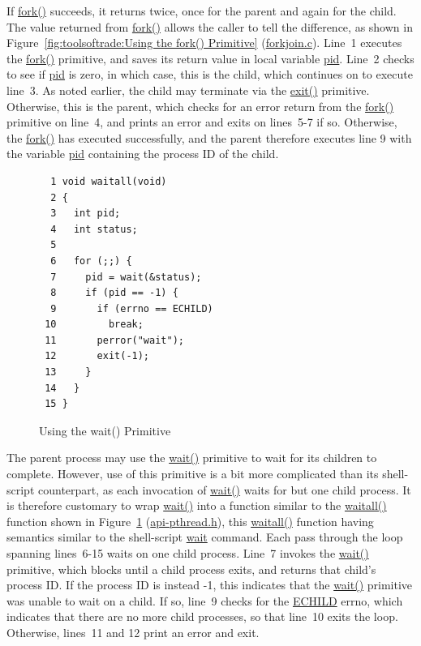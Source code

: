 If \url{fork()} succeeds, it returns twice, once for the parent
and again for the child.
The value returned from \url{fork()} allows the caller to tell
the difference, as shown in
Figure~\ref{fig:toolsoftrade:Using the fork() Primitive}
(\url{forkjoin.c}).
Line~1 executes the \url{fork()} primitive, and saves its return value
in local variable \url{pid}.
Line~2 checks to see if \url{pid} is zero, in which case, this is the
child, which continues on to execute line~3.
As noted earlier, the child may terminate via the \url{exit()} primitive.
Otherwise, this is the parent, which checks for an error return from
the \url{fork()} primitive on line~4, and prints an error and exits
on lines~5-7 if so.
Otherwise, the \url{fork()} has executed successfully, and the parent
therefore executes line 9 with the variable \url{pid} containing the
process ID of the child.

\begin{figure}[tbp]
{ \scriptsize
\begin{verbatim}
  1 void waitall(void)
  2 {
  3   int pid;
  4   int status;
  5 
  6   for (;;) {
  7     pid = wait(&status);
  8     if (pid == -1) {
  9       if (errno == ECHILD)
 10         break;
 11       perror("wait");
 12       exit(-1);
 13     }
 14   }
 15 }
\end{verbatim}
}
\caption{Using the wait() Primitive}
\label{fig:toolsoftrade:Using the wait() Primitive}
\end{figure}

The parent process may use the \url{wait()} primitive to wait for its children
to complete.
However, use of this primitive is a bit more complicated than its shell-script
counterpart, as each invocation of \url{wait()} waits for but one child
process.
It is therefore customary to wrap \url{wait()} into a function similar
to the \url{waitall()} function shown in
Figure~\ref{fig:toolsoftrade:Using the wait() Primitive}
(\url{api-pthread.h}),
this \url{waitall()} function having semantics similar to the
shell-script \url{wait} command.
Each pass through the loop spanning lines~6-15 waits on one child process.
Line~7 invokes the \url{wait()} primitive, which blocks until a child process
exits, and returns that child's process ID.
If the process ID is instead -1, this indicates that the \url{wait()}
primitive was unable to wait on a child.
If so, line~9 checks for the \url{ECHILD} errno, which indicates that there
are no more child processes, so that line~10 exits the loop.
Otherwise, lines~11 and 12 print an error and exit.

